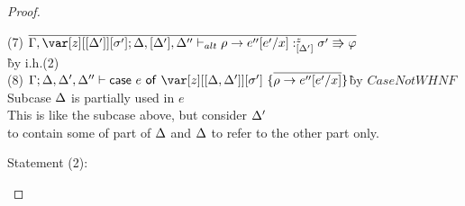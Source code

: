 \begin{proof}
\begin{description}
\begin{tabbing}
    (7) $\ov{\G,\z[\irr{\D'}][\s']; \D,[\D'],\D'' \vdash_{alt} \rho \to e''[e'/x] :^z_{\irr{\D'}} \s'\Rrightarrow\vp}$\\\` by i.h.(2)\\
    (8) $\G; \D, \D', \D'' \vdash \ccase{e}{\z[\irr{\D,\D'}][\s']~\{\ov{\rho\to e''[e'/x]}\}}$\`by $CaseNotWHNF$\\
    Subcase $\Delta$ is partially used in $e$\\
    This is like the subcase above, but consider $\Delta'$\\
    to contain some of part of $\Delta$ and $\Delta$ to refer to the other part only.
\end{tabbing}

\end{description}





Statement (2):
\begin{description}


\end{description}
\end{proof}
